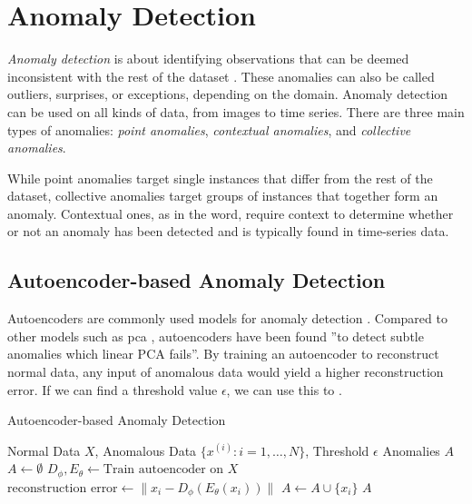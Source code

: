 \section{Anomaly Detection}
\label{back:anomdet}

\textit{Anomaly detection} is about identifying observations that can be deemed inconsistent with the rest of the dataset \cite{anomaly}. These anomalies can also be called outliers, surprises, or exceptions, depending on the domain. Anomaly detection can be used on all kinds of data, from images to time series. There are three main types of anomalies: \textit{point anomalies}, \textit{contextual anomalies}, and \textit{collective anomalies}.

While point anomalies target single instances that differ from the rest of the dataset, collective anomalies target groups of instances that together form an anomaly. Contextual ones, as in the word, require context to determine whether or not an anomaly has been detected and is typically found in time-series data.



\subsection{Autoencoder-based Anomaly Detection}

Autoencoders are commonly used models for anomaly detection \cite{an2015variational, zhou2017anomaly}. Compared to other models such as \acrfull{pca} \cite{wold1987principal}, autoencoders have been found ''to detect subtle anomalies which linear PCA fails''\cite{sakurada2014anomaly}. By training an autoencoder to reconstruct normal data, any input of anomalous data would yield a higher reconstruction error. If we can find a threshold value $\epsilon$, we can use this to . 

\begin{algorithm}[!h]
\caption{Autoencoder-based Anomaly Detection}
\label{alg:ad}
\begin{algorithmic}[1]
\small
\Require Normal Data $X$, Anomalous Data $\{x^{(i)} : i = 1, \ldots, N\}$, Threshold $\epsilon$
\Ensure Anomalies $A$
\State $A \gets \emptyset$
\State $D_\phi, E_\theta \gets \text{Train autoencoder on } X$
    \State $\text{reconstruction error} \gets \|x_i - D_\phi(E_\theta(x_i))\|$
        \State $A \gets A \cup \{x_i\}$
    \EndIf
\EndFor
\State \Return $A$
\end{algorithmic}
\end{algorithm}


